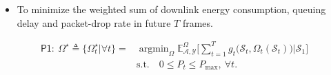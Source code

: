 \documentclass[paperwidth=46.8in,paperheight=26.3in,fontscale=0.35]{baposter}
\begin{document}
\begin{poster}
{        \begin{itemize}
            \item To minimize the weighted sum of downlink energy consumption, queuing delay and packet-drop rate in future $T$ frames.
        \end{itemize}
        \vspace{-1em}
        \begin{align*}
            \bm{\mathsf{P1:}}\ \Omega^{\star}
            \!\triangleq\!
            \{\Omega_{t}^{\star}|\forall t\}
            \!=\!
             &
            \mathop{\arg\min}_{\Omega}\mathbb{E}_{\mathcal{A},\mathcal{Y}}^{\Omega}\big[\sum_{t\!=\!1}^{T}g_{t}\big(\!\mathcal{S}_{t},\Omega_{t}(\!\mathcal{S}_{t}\!)\!\big)\big|\mathcal{S}_{1}\big] \\
             &
            \mathrm{s.t.}\quad 0\leq P_{t}\leq P_{\mathrm{max}},\ \forall t.
        \end{align*}
    }


\end{poster}
\end{document}
